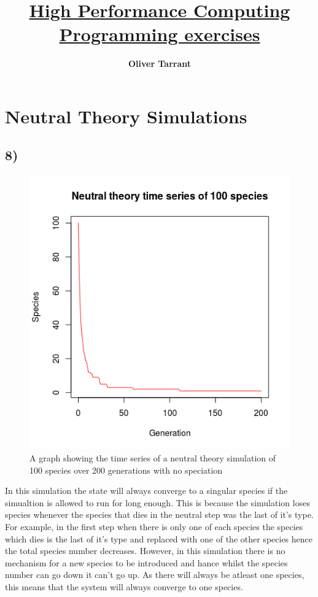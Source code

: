 \documentclass[11pt]{article}
\title{\bf \underline{High Performance Computing Programming exercises}}
\author{\bf Oliver Tarrant}
\date{}
\begin{document}
\maketitle
\section{Neutral Theory Simulations}
\subsection*{8)}
\begin{figure}[H]
\begin{center}
\includegraphics[scale=0.5]{../Results/Plots/Neutral_theory_time_series.png}
\caption{A graph showing the time series of a neutral theory simulation of 100 species over 200 generations with no speciation}
\end{center}
\end{figure}
In this simulation the state will always converge to a singular species if the simualtion is allowed to run for long enough. This is because the simulation loses species whenever the species that dies in the neutral step was the last of it's type. For example, in the first step when there is only one of each species the species which dies is the last of it's type and replaced with one of the other species hence the total species number decreases. However, in this simulation there is no mechanism for a new species to be introduced and hance whilst the species number can go down it can't go up. As there will always be atleast one species, this means that the system will always converge to one species.
\end{document}
